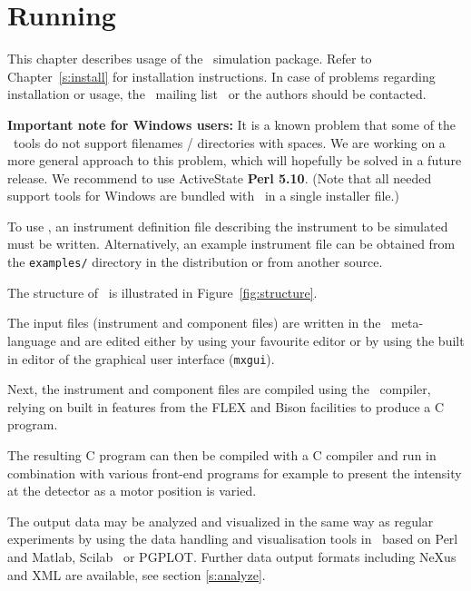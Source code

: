 
\chapter{Running \MCX}
\label{c:running}
This chapter describes usage of the \MCX\ simulation package. Refer
to Chapter~\ref{s:install} for installation instructions. In case of
problems regarding installation or usage, the \MCX\ mailing
list~\cite{mcxtrace_webpage} or the authors should be contacted.

{\bfseries Important note for Windows users:} It is a known problem that some of
the \MCX\ tools do not support filenames / directories with spaces.
We are working on a more general approach to this problem, which will
hopefully be solved in a future release. We recommend to use
ActiveState {\bfseries Perl 5.10}. (Note that all needed
support tools for Windows are bundled with \MCX\ in a single installer file.)

To use \MCX, an instrument
definition file describing the instrument to be simulated must be
written. Alternatively, an example instrument file can be obtained
from the \verb+examples/+ directory in the distribution or from
another source.

The structure of \MCX\ is illustrated in Figure~\ref{fig:structure}.

The input files (instrument and component files) are written in the \MCX\
meta-language and are edited either by using your favourite editor
or by using the built in editor of the graphical user interface
(\texttt{mxgui}).

Next, the instrument and component files are compiled using the \MCX\
compiler, relying on built in features from the FLEX and Bison facilities to produce a C program.

The resulting C program can then be
compiled with a C compiler and run in combination with various
front-end programs for example to present the intensity at the
detector as a motor position is varied.

The output data may be analyzed and visualized in the same way as
regular experiments by using the data handling and visualisation tools in \MCX\ based on
Perl and Matlab, Scilab~\cite{scilab_webpage} or PGPLOT. Further data
output formats including NeXus and XML are available, see section \ref{s:analyze}.

%

